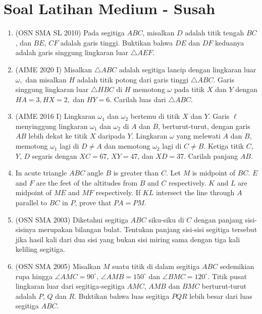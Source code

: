 \documentclass[11pt]{scrartcl}
\begin{document}
\section{Soal Latihan Medium - Susah}
\begin{enumerate}
    \item (OSN SMA SL 2010) Pada segitiga $ABC$, misalkan $D$ adalah titik tengah $BC$, dan $BE$, $CF$ adalah garis tinggi. Buktikan bahwa $DE$ dan $DF$ keduanya adalah garis singgung lingkaran luar $\triangle AEF$. %

    \item (AIME 2020 I) Misalkan $\triangle ABC$ adalah segitiga lancip dengan lingkaran luar $\omega,$ dan misalkan $H$ adalah titik potong dari garis tinggi $\triangle ABC.$ Garis singgung lingkaran luar $\triangle HBC$ di $H$ memotong $\omega$ pada titik $X$ dan $Y$ dengan $HA=3,HX=2,$ dan $HY=6.$ Carilah luas dari $\triangle ABC$.

    \item (AIME 2016 I) Lingkaran $\omega_1$ dan $\omega_2$ bertemu di titik $X$ dan $Y$. Garis $\ell$ menyinggung lingkaran $\omega_1$ dan $\omega_2$ di $A$ dan $B$, berturut-turut, dengan garis $AB$ lebih dekat ke titik $X$ daripada $Y$. Lingkaran $\omega$ yang melewati $A$ dan $B$, memotong $\omega_1$ lagi di $D \neq A$ dan memotong $\omega_2$ lagi di $C \neq B$. Ketiga titik $C$, $Y$, $D$ segaris dengan $XC = 67$, $XY = 47$, dan $XD = 37$. Carilah panjang $AB$.

    \item In acute triangle $ABC$ angle $B$ is greater than $C$. Let $M$ is midpoint of $BC$. $E$ and $F$ are the feet of the altitudes from $B$ and $C$ respectively. $K$ and $L$ are midpoint of $ME$ and $MF$ respectively. If $KL$ intersect the line through $A$ parallel to $BC$ in $P$, prove that $PA = PM$.
    
    \item (OSN SMA 2003) Diketahui segitiga $ABC$ siku-siku di $C$ dengan panjang sisi-sisinya merupakan bilangan bulat. Tentukan panjang sisi-sisi segitiga tersebut jika hasil kali dari dua sisi yang bukan sisi miring sama dengan tiga kali keliling segitiga.

    \item (OSN SMA 2005) Misalkan $M$ suatu titik di dalam segitiga $ABC$ sedemikian rupa hingga $\angle AMC = 90^\circ$, $\angle AMB = 150^\circ$ dan $\angle BMC = 120^\circ$. Titik pusat lingkaran luar dari segitiga-segitiga $AMC$, $AMB$ dan $BMC$ berturut-turut adalah $P$, $Q$ dan $R$. Buktikan bahwa luas segitiga $PQR$ lebih besar dari luas segitiga $ABC$.


\end{enumerate}
\end{document}
